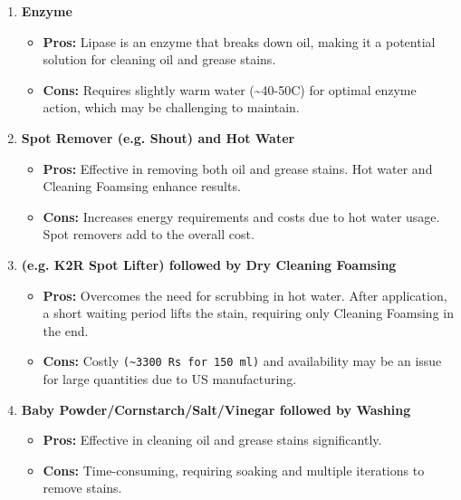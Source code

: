\documentclass[table,french,english]{rapportCS}
\begin{document}
\begin{enumerate}
    \item \textbf{  Enzyme}
    \begin{itemize}[label=$\bullet$]
        \item \textbf{Pros:} Lipase is an enzyme that breaks down oil, making it a potential solution for cleaning oil and grease stains.
        \item \textbf{Cons:} Requires slightly warm water (\textasciitilde40-50\textdegree C) for optimal enzyme action, which may be challenging to maintain.
    \end{itemize}

    \item \textbf{Spot Remover (e.g. Shout) and Hot Water}
    \begin{itemize}[label=$\bullet$]
        \item \textbf{Pros:} Effective in removing both oil and grease stains. Hot water and Cleaning Foamsing enhance results.
        \item \textbf{Cons:} Increases energy requirements and costs due to hot water usage. Spot removers add to the overall cost.
    \end{itemize}

    \item \textbf{ (e.g. K2R Spot Lifter) followed by Dry Cleaning Foamsing}
    \begin{itemize}[label=$\bullet$]
        \item \textbf{Pros:} Overcomes the need for scrubbing in hot water. After application, a short waiting period lifts the stain, requiring only Cleaning Foamsing in the end.
        \item \textbf{Cons:} Costly \texttt{(\textasciitilde{3300} Rs for 150 ml)} and availability may be an issue for large quantities due to US manufacturing.
    \end{itemize}

    \item \textbf{Baby Powder/Cornstarch/Salt/Vinegar followed by Washing}
    \begin{itemize}[label=$\bullet$]
        \item \textbf{Pros:} Effective in cleaning oil and grease stains significantly.
        \item \textbf{Cons:} Time-consuming, requiring soaking and multiple iterations to remove stains.
    \end{itemize}


\end{enumerate}
\end{document}
